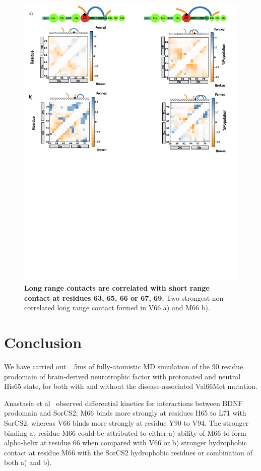 \documentclass[10pt,letterpaper]{article}
\begin{document}
\begin{figure}[!ht]
\includegraphics[scale=0.5,width=12cm,trim={0 0cm 0 0cm},clip]{../figures/fig9.pdf}
\caption{{\bf Long range contacts are correlated with short range contact at residues 63, 65, 66 or 67, 69.} Two strongest non-correlated long range contact formed in V66 a) and M66 b). 
 }
\label{fig9}
\end{figure}
\section*{Conclusion}

We have carried out ~.5ms of fully-atomistic MD simulation of the 90 residue prodomain of brain-derived neurotrophic factor with protonated and neutral His65 state, for both with and without the disease-associated Val66Met mutation.  

Anastasia et al~\cite{Anastasia2013} observed differential kinetics for interactions between BDNF prodomain and SorCS2; M66 binds more strongly at residues H65 to L71 with SorCS2, whereas V66 binds more strongly at residue Y90 to V94. 
The stronger binding at residue M66 could be attributed to either a) ability of M66 to form alpha-helix at residue 66 when compared with V66 or b) stronger hydrophobic contact at residue M66 with the SorCS2 hydrophobic residues or combination of both a) and b). 
\end{document}
